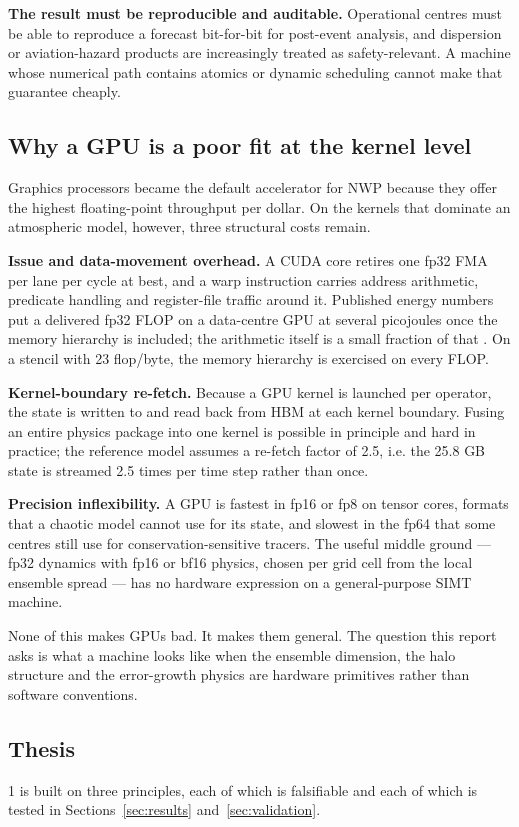 \textbf{The result must be reproducible and auditable.} Operational centres must be able to
reproduce a forecast bit-for-bit for post-event analysis, and dispersion or aviation-hazard
products are increasingly treated as safety-relevant. A machine whose numerical path contains
atomics or dynamic scheduling cannot make that guarantee cheaply.

\subsection{Why a GPU is a poor fit at the kernel level}
Graphics processors became the default accelerator for NWP because they offer the highest
floating-point throughput per dollar. On the kernels that dominate an atmospheric model, however,
three structural costs remain.

\textbf{Issue and data-movement overhead.} A CUDA core retires one fp32 FMA per lane per cycle at
best, and a warp instruction carries address arithmetic, predicate handling and register-file
traffic around it. Published energy numbers put a delivered fp32 FLOP on a data-centre GPU at
several picojoules once the memory hierarchy is included; the arithmetic itself is a small
fraction of that \cite{horowitz2014}. On a stencil with 23 flop/byte, the memory hierarchy is
exercised on every FLOP.

\textbf{Kernel-boundary re-fetch.} Because a GPU kernel is launched per operator, the state is
written to and read back from HBM at each kernel boundary. Fusing an entire physics package into
one kernel is possible in principle and hard in practice; the reference model assumes a re-fetch
factor of 2.5, i.e. the 25.8 GB state is streamed 2.5 times per time step rather than once.

\textbf{Precision inflexibility.} A GPU is fastest in fp16 or fp8 on tensor cores, formats that a
chaotic model cannot use for its state, and slowest in the fp64 that some centres still use for
conservation-sensitive tracers. The useful middle ground --- fp32 dynamics with fp16 or bf16
physics, chosen per grid cell from the local ensemble spread --- has no hardware expression on a
general-purpose SIMT machine.

None of this makes GPUs bad. It makes them general. The question this report asks is what a
machine looks like when the ensemble dimension, the halo structure and the error-growth physics are
hardware primitives rather than software conventions.

\subsection{Thesis}
\ac{1} is built on three principles, each of which is falsifiable and each of which is tested in
Sections~\ref{sec:results} and~\ref{sec:validation}.

